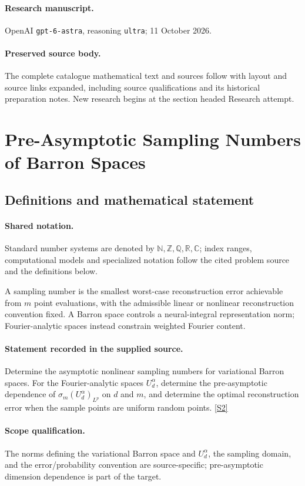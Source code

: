 \documentclass[11pt]{article}
\begin{document}
\paragraph{Research manuscript.} OpenAI \texttt{gpt-6-astra}, reasoning \texttt{ultra}; 11 October 2026.
\paragraph{Preserved source body.} The complete catalogue mathematical text and sources follow with layout and source links expanded, including source qualifications and its historical preparation notes. New research begins at the section headed Research attempt.

\section{Pre-Asymptotic Sampling Numbers of Barron Spaces}\label{statement}

\subsection{Definitions and mathematical statement}

\paragraph{Shared notation.}Standard number systems are denoted by $\mathbb N,\mathbb Z,\mathbb Q,\mathbb R,\mathbb C$; index ranges, computational models and specialized notation follow the cited problem source and the definitions below.


A sampling number is the smallest worst-case reconstruction error achievable from $m$ point evaluations, with the admissible linear or nonlinear reconstruction convention fixed. A Barron space controls a neural-integral representation norm; Fourier-analytic spaces instead constrain weighted Fourier content.
\paragraph{Statement recorded in the supplied source.}
Determine the asymptotic nonlinear sampling numbers for variational Barron spaces. For the Fourier-analytic spaces $U_d^\alpha$, determine the pre-asymptotic dependence of $\sigma_m(U_d^\alpha)_{L^p}$ on $d$ and $m$, and determine the optimal reconstruction error when the sample points are uniform random points. \href{https://doi.org/10.4171/owr/2024/21}{[S2]}
\paragraph{Scope qualification.}
The norms defining the variational Barron space and $U_d^\alpha$, the sampling domain, and the error/probability convention are source-specific; pre-asymptotic dimension dependence is part of the target.
\end{document}
